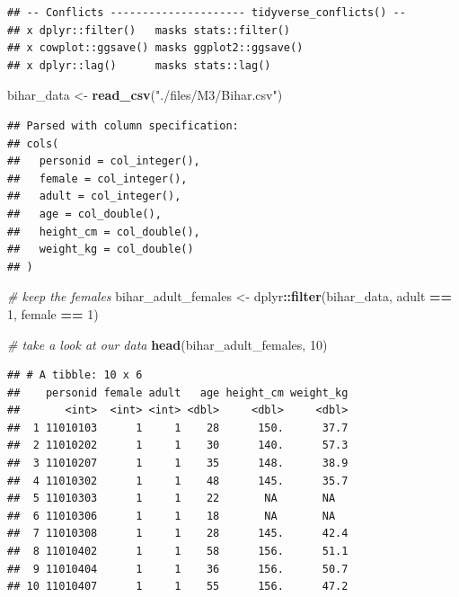 \documentclass[]{book}
\newenvironment{Shaded}{\begin{snugshade}}{\end{snugshade}}
\newcommand{\KeywordTok}[1]{\textcolor[rgb]{0.13,0.29,0.53}{\textbf{#1}}}
\newcommand{\DecValTok}[1]{\textcolor[rgb]{0.00,0.00,0.81}{#1}}
\newcommand{\StringTok}[1]{\textcolor[rgb]{0.31,0.60,0.02}{#1}}
\newcommand{\CommentTok}[1]{\textcolor[rgb]{0.56,0.35,0.01}{\textit{#1}}}
\newcommand{\OperatorTok}[1]{\textcolor[rgb]{0.81,0.36,0.00}{\textbf{#1}}}
\newcommand{\NormalTok}[1]{#1}
\theoremstyle{definition}
\theoremstyle{definition}
\theoremstyle{definition}
\theoremstyle{remark}
\begin{document}
\begin{verbatim}
## -- Conflicts --------------------- tidyverse_conflicts() --
## x dplyr::filter()   masks stats::filter()
## x cowplot::ggsave() masks ggplot2::ggsave()
## x dplyr::lag()      masks stats::lag()
\end{verbatim}

\begin{Shaded}
\begin{Highlighting}[]
\NormalTok{bihar_data <-}\StringTok{ }\KeywordTok{read_csv}\NormalTok{(}\StringTok{"./files/M3/Bihar.csv"}\NormalTok{)}
\end{Highlighting}
\end{Shaded}

\begin{verbatim}
## Parsed with column specification:
## cols(
##   personid = col_integer(),
##   female = col_integer(),
##   adult = col_integer(),
##   age = col_double(),
##   height_cm = col_double(),
##   weight_kg = col_double()
## )
\end{verbatim}

\begin{Shaded}
\begin{Highlighting}[]
\CommentTok{# keep the females}
\NormalTok{bihar_adult_females <-}\StringTok{ }\NormalTok{dplyr}\OperatorTok{::}\KeywordTok{filter}\NormalTok{(bihar_data, adult }\OperatorTok{==}\StringTok{ }\DecValTok{1}\NormalTok{, female }\OperatorTok{==}\StringTok{ }\DecValTok{1}\NormalTok{)}

\CommentTok{# take a look at our data}
\KeywordTok{head}\NormalTok{(bihar_adult_females, }\DecValTok{10}\NormalTok{)}
\end{Highlighting}
\end{Shaded}

\begin{verbatim}
## # A tibble: 10 x 6
##    personid female adult   age height_cm weight_kg
##       <int>  <int> <int> <dbl>     <dbl>     <dbl>
##  1 11010103      1     1    28      150.      37.7
##  2 11010202      1     1    30      140.      57.3
##  3 11010207      1     1    35      148.      38.9
##  4 11010302      1     1    48      145.      35.7
##  5 11010303      1     1    22       NA       NA  
##  6 11010306      1     1    18       NA       NA  
##  7 11010308      1     1    28      145.      42.4
##  8 11010402      1     1    58      156.      51.1
##  9 11010404      1     1    36      156.      50.7
## 10 11010407      1     1    55      156.      47.2
\end{verbatim}
\end{document}
